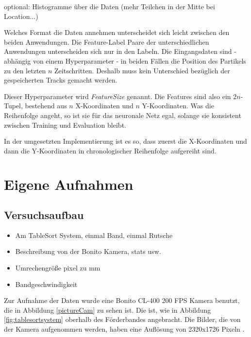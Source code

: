 optional: Histogramme über die Daten (mehr Teilchen in der Mitte bei Location...)
\color{black}

Welches Format die Daten annehmen unterscheidet sich leicht zwischen den beiden Anwendungen.
Die Feature-Label Paare der unterschiedlichen Anwendungen unterscheiden sich nur in den Labeln.
Die Eingangsdaten sind - abhängig von einem Hyperparameter - 
in beiden Fällen die Position des Partikels zu den letzten \(n\) Zeitschritten.
Deshalb muss kein Unterschied bezüglich der gespeicherten Tracks gemacht werden.

Dieser Hyperparameter wird \textit{FeatureSize} genannt. 
Die Features sind also ein \(2n\)-Tupel, bestehend aus \(n\) X-Koordinaten und \(n\) Y-Koordinaten.
Was die Reihenfolge angeht, so ist sie für das neuronale Netz egal, solange sie konsistent zwischen Training und Evaluation bleibt.

In der umgesetzten Implementierung ist es so, dass zuerst die X-Koordinaten 
und dann die Y-Koordinaten in chronologischer Reihenfolge aufgereiht sind. 




\section{Eigene Aufnahmen}

\subsection{Versuchsaufbau}

\color{blue}
\begin{itemize}
	\item Am TableSort System, einmal Band, einmal Rutsche
	\item Beschreibung von der Bonito Kamera, stats usw.
	\item Umrechengröße pixel zu mm
	\item Bandgeschwindigkeit
\end{itemize}
\color{black}


Zur Aufnahme der Daten wurde eine Bonito CL-400 200 FPS Kamera benutzt, die in Abbildung \ref{pictureCam} zu sehen ist.
Die ist, wie in Abbildung \ref{fig:tablesortsystem} oberhalb des Förderbandes angebracht.
Die Bilder, die von der Kamera aufgenommen werden, haben eine Auflösung von 2320x1726 Pixeln \cite{alliedvisiontechnologiesgmbh2014}.

